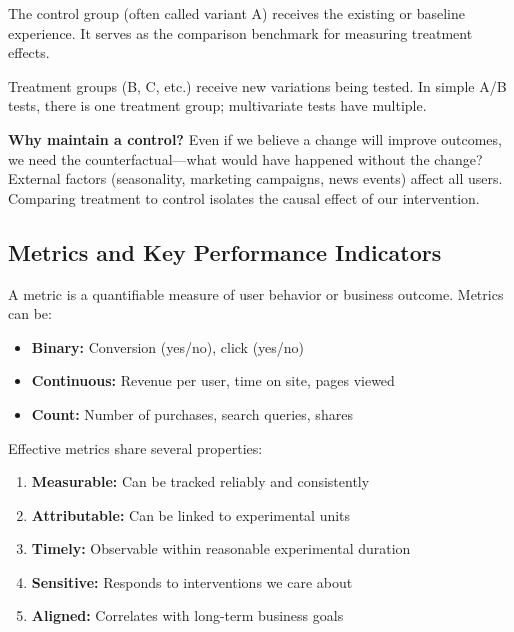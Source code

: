 \begin{definition}
The control group (often called variant A) receives the existing or baseline experience. It serves as the comparison benchmark for measuring treatment effects.
\end{definition}

\begin{definition}
Treatment groups (B, C, etc.) receive new variations being tested. In simple A/B tests, there is one treatment group; multivariate tests have multiple.
\end{definition}

\textbf{Why maintain a control?} Even if we believe a change will improve outcomes, we need the counterfactual—what would have happened without the change? External factors (seasonality, marketing campaigns, news events) affect all users. Comparing treatment to control isolates the causal effect of our intervention.

\subsection{Metrics and Key Performance Indicators}

\begin{definition}[Metric]
A metric is a quantifiable measure of user behavior or business outcome. Metrics can be:
\begin{itemize}
    \item \textbf{Binary:} Conversion (yes/no), click (yes/no)
    \item \textbf{Continuous:} Revenue per user, time on site, pages viewed
    \item \textbf{Count:} Number of purchases, search queries, shares
\end{itemize}
\end{definition}

Effective metrics share several properties:
\begin{enumerate}
    \item \textbf{Measurable:} Can be tracked reliably and consistently
    \item \textbf{Attributable:} Can be linked to experimental units
    \item \textbf{Timely:} Observable within reasonable experimental duration
    \item \textbf{Sensitive:} Responds to interventions we care about
    \item \textbf{Aligned:} Correlates with long-term business goals
\end{enumerate}

